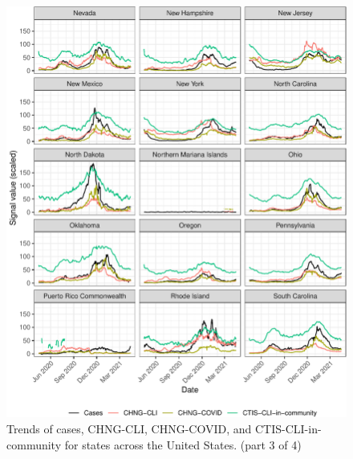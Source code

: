 \begin{figure}

{\centering \includegraphics[width=\textwidth]{fig/state-trend-grids-3-1}

}

\caption{Trends of cases, CHNG-CLI, CHNG-COVID, and CTIS-CLI-in-community for states across the United States. (part 3 of 4)}\label{fig:state-trend-grids-3}
\end{figure}

\clearpage

